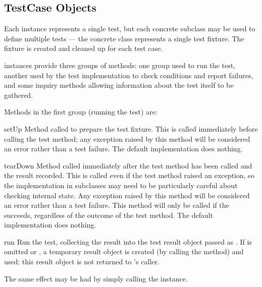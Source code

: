 \subsection{TestCase Objects
            \label{testcase-objects}}

Each  instance represents a single test, but each
concrete subclass may be used to define multiple tests --- the
concrete class represents a single test fixture.  The fixture is
created and cleaned up for each test case.

 instances provide three groups of methods: one group
used to run the test, another used by the test implementation to
check conditions and report failures, and some inquiry methods
allowing information about the test itself to be gathered.

Methods in the first group (running the test) are:

\begin{methoddesc}[TestCase]{setUp}{}
  Method called to prepare the test fixture.  This is called
  immediately before calling the test method; any exception raised by
  this method will be considered an error rather than a test failure.
  The default implementation does nothing.
\end{methoddesc}

\begin{methoddesc}[TestCase]{tearDown}{}
  Method called immediately after the test method has been called and
  the result recorded.  This is called even if the test method raised
  an exception, so the implementation in subclasses may need to be
  particularly careful about checking internal state.  Any exception
  raised by this method will be considered an error rather than a test
  failure.  This method will only be called if the 
  succeeds, regardless of the outcome of the test method.
  The default implementation does nothing.  
\end{methoddesc}

\begin{methoddesc}[TestCase]{run}{}
  Run the test, collecting the result into the test result object
  passed as .  If  is omitted or ,
  a temporary result object is created (by calling the
   method) and used; this result object is not
  returned to 's caller.
  
  The same effect may be had by simply calling the 
  instance.
\end{methoddesc}

